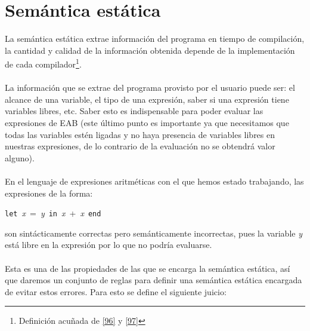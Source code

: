     \section{Semántica estática}
    La semántica estática extrae información del programa en tiempo de compilación, la cantidad y calidad de la información obtenida depende de la implementación de cada compilador\footnote{Definición acuñada de \hyperlink{96}{[96]} y \hyperlink{97}{[97]}}. \\\\
    La información que se extrae del programa provisto por el usuario puede ser: el alcance de una variable, el tipo de una expresión, saber si una expresión tiene variables libres, etc. Saber esto es indispensable  para poder evaluar las expresiones de \textsf{EAB} (este último punto es importante ya que necesitamos que todas las variables estén ligadas y no haya presencia de variables libres en nuestras expresiones, de lo contrario de la evaluación no se obtendrá valor alguno).\\\\
    En el lenguaje de expresiones aritméticas con el que hemos estado trabajando, las expresiones de la forma:
        \begin{center}
                \texttt{let}\ \textit{x}\ =\ \textit{y}\ \texttt{in}\ \textit{x}\ +\ \textit{x}\ \texttt{end}
        \end{center}
    son sintácticamente correctas pero semánticamente incorrectas, pues la variable \textit{y} está libre en la expresión por lo que no podría evaluarse.\\\\
    Esta es una de las propiedades de las que se encarga la semántica estática, así que daremos un conjunto de reglas para definir una semántica estática encargada de evitar estos errores. Para esto se define el siguiente juicio: 

    \bigskip
    

